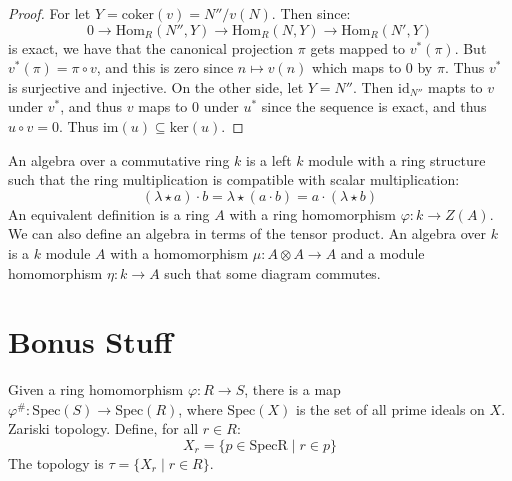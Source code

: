    \begin{proof}
        For let $Y=\textrm{coker}(v)=N''/v(N)$. Then since:
        \begin{equation}
            0\rightarrow\textrm{Hom}_{R}(N'',Y)
            \rightarrow\textrm{Hom}_{R}(N,Y)
            \rightarrow\textrm{Hom}_{R}(N',Y)
        \end{equation}
        is exact, we have that the canonical projection $\pi$ gets mapped
        to $v^{*}(\pi)$. But $v^{*}(\pi)=\pi\circ{v}$, and this is zero
        since $n\mapsto{v}(n)$ which maps to $0$ by $\pi$. Thus $v^{*}$ is
        surjective and injective. On the other side, let $Y=N''$. Then
        $\textrm{id}_{N''}$ mapts to $v$ under $v^{*}$, and thus
        $v$ maps to $0$ under $u^{*}$ since the sequence is exact, and
        thus $u\circ{v}=0$. Thus $\textrm{im}(u)\subseteq\textrm{ker}(u)$.
    \end{proof}
    An algebra over a commutative ring $k$ is a left $k$ module with a ring
    structure such that the ring multiplication is compatible with scalar
    multiplication:
    \begin{equation}
        (\lambda\star{a})\cdot{b}=\lambda\star(a\cdot{b})
            =a\cdot(\lambda\star{b})
    \end{equation}
    An equivalent definition is a ring $A$ with a ring homomorphism
    $\varphi:k\rightarrow{Z}(A)$. We can also define an algebra in terms of
    the tensor product. An algebra over $k$ is a $k$ module $A$ with a
    homomorphism $\mu:A\otimes{A}\rightarrow{A}$ and a module homomorphism
    $\eta:k\rightarrow{A}$ such that some diagram commutes.
\section{Bonus Stuff}
    Given a ring homomorphism $\varphi:R\rightarrow{S}$, there is a map
    $\varphi^{\#}:\textrm{Spec}(S)\rightarrow\textrm{Spec}(R)$, where
    $\textrm{Spec}(X)$ is the set of all prime ideals on $X$.
    Zariski topology. Define, for all $r\in{R}$:
    \begin{equation}
        X_{r}=\{p\in\textrm{Spec{R}}\;|\;r\in{p}\}
    \end{equation}
    The topology is $\tau=\{X_{r}\;|\;r\in{R}\}$.
